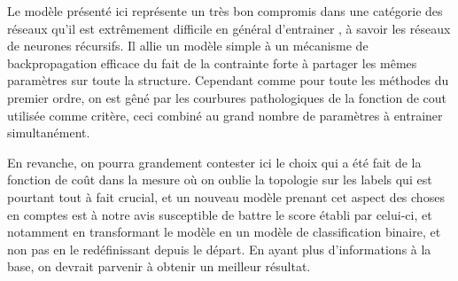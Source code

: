 \documentclass[conference]{IEEEtran}
\begin{document}
Le modèle présenté ici représente un très bon compromis dans une catégorie des réseaux qu'il est extrêmement difficile en général d'entrainer , à savoir les réseaux de neurones récursifs. Il allie un modèle simple à un mécanisme de backpropagation efficace du fait de la contrainte forte à partager les mêmes paramètres sur toute la structure. Cependant comme pour toute les méthodes du premier ordre, on est gêné par les courbures pathologiques de la fonction de cout utilisée comme critère, ceci combiné au grand nombre de paramètres à entrainer simultanément.

En revanche, on pourra grandement contester ici le choix qui a été fait de la fonction de coût dans la mesure où on oublie la topologie sur les labels qui est pourtant tout à fait crucial, et un nouveau modèle prenant cet aspect des choses en comptes est à notre avis susceptible de battre le score établi par celui-ci, et notamment en transformant le modèle en un modèle de classification binaire, et non pas en le redéfinissant depuis le départ. En ayant plus d'informations à la base, on devrait parvenir à obtenir un meilleur résultat.
%
%

\end{document}
